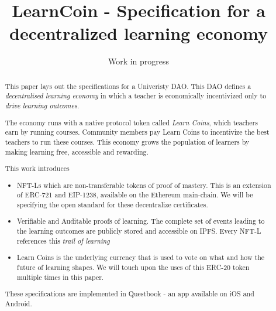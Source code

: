 \documentclass{article}
\author{Work in progress}
\title{LearnCoin - Specification for a decentralized learning economy}
\begin{document}
  \maketitle
  \begin{abstract}
    This paper lays out the specifications for a Univeristy DAO.
    This DAO defines a \textit{decentralised learning economy} in which a teacher is economically incentivized only to \textit{drive learning outcomes}.
    \par
    The economy runs  with a native protocol token called  \textit{Learn Coins}, which teachers earn by running courses. 
    Community members pay Learn Coins to incentivize the best teachers to run these courses.
    This economy grows the population of learners by making learning free, accessible and rewarding. %
    \par
    This work introduces
    \begin{itemize}
      \item NFT-Ls which are non-transferable tokens of proof of mastery. 
        This is an extension of ERC-721 and EIP-1238, available on the Ethereum main-chain. 
        We will be specifying the open standard for these decentralize certificates.
      \item Verifiable and Auditable proofs of learning. 
        The complete set of events leading to the learning outcomes are publicly stored and accessible on IPFS.
        Every NFT-L references this \textit{trail of learning}
      \item Learn Coins is the underlying currency that is used to vote on what and how the future of learning shapes. 
        We will touch upon the uses of this ERC-20 token multiple times in this paper.
    \end{itemize}
    \par
    These specifications are implemented in Questbook - an app available on iOS and Android.
  \end{abstract}
\end{document}
